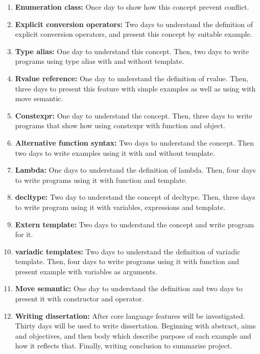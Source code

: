 \documentclass[11pt,]{report}
\begin{document}
\begin{enumerate}
\item \textbf{Enumeration class:} Once day to show how this concept prevent conflict.

\item \textbf{Explicit conversion operators:} Two days to understand the \linebreak definition of explicit conversion operators, and present this concept by suitable example.

\item \textbf{Type alias: } One day to understand this concept. Then, two days to write programs using type alias with and without template.

\item \textbf{Rvalue reference:} One day to understand the definition of rvalue. Then, three days to present this feature with simple examples as well as using with move semantic.

\item \textbf{Constexpr:} One day to understand the concept. Then, three days to write programs that show how using constexpr with function and object.

\item \textbf{Alternative function syntax:} Two days to understand the concept. Then two days to write examples using it with and without template.

\item \textbf{Lambda:} One days to understand the definition of lambda. Then, four days to write programs using it with function and template.

\item \textbf{decltype:} Two day to understand the concept of decltype. Then, three days to write program using it with variables, expressions and template.

\item \textbf{Extern template:} Two days to understand the concept and write \linebreak program for it.

\item \textbf{variadic templates: } Two days to understand the definition of variadic template. Then, four days to write programs using it with function and present example with variables as arguments.

\item \textbf{Move semantic:} One day to understand the definition and two days to present it with constructor and operator.

\item \textbf{Writing dissertation:} After core language features will be \linebreak investigated. Thirty  days  will be used to write dissertation. Beginning with abstract, aims and objectives, and then body which describe purpose of each example and how it reflects that. Finally, writing conclusion to summarise project.


\end{enumerate}
\end{document}
